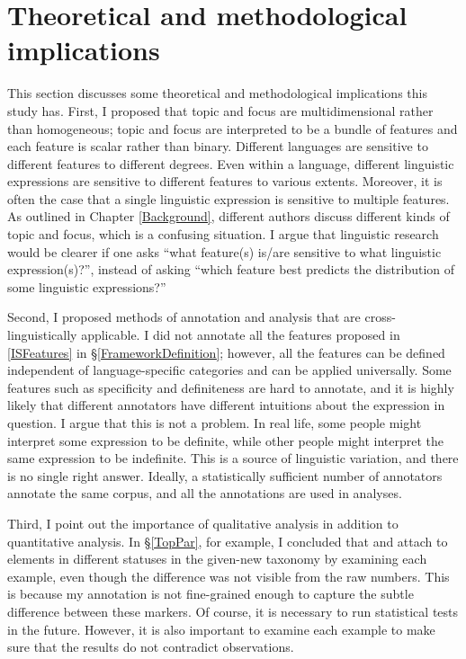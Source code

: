 \section{Theoretical and methodological implications}

This section discusses some theoretical and methodological implications
this study has.
First, I proposed that topic and focus are multidimensional
rather than homogeneous;
topic and focus are interpreted to be a bundle of features and
each feature is scalar rather than binary.
Different languages are sensitive to different features to different degrees.
Even within a language,
different linguistic expressions are sensitive to different features to various extents.
Moreover, it is often the case that
a single linguistic expression is sensitive to multiple features.
As outlined in Chapter \ref{Background},
different authors discuss different kinds of topic and focus,
which is a confusing situation.
I argue that linguistic research would be clearer if one asks
``what feature(s) is/are sensitive to what linguistic expression(s)?'',
instead of asking
``which feature best predicts the distribution of some linguistic expressions?''

Second,
I proposed methods of annotation and analysis
that are cross-linguistically applicable.
I did not annotate all the features proposed in \ref{ISFeatures} in \S \ref{FrameworkDefinition};
however, all the features can be defined independent of language-specific categories and can be applied universally.
Some features such as specificity and definiteness are hard to annotate, and it is highly likely that different annotators have different intuitions about the expression in question.
I argue that this is not a problem.
In real life,
some people might interpret some expression to be definite,
while other people might interpret the same expression to be indefinite.
This is a source of linguistic variation, and there is no single right answer.
Ideally, a statistically sufficient number of annotators annotate the same corpus, and all the annotations are used in analyses.

Third,
I point out the importance of qualitative analysis in addition to quantitative analysis.
In \S \ref{TopPar}, for example,
I concluded that  and  attach to elements in different statuses in the given-new taxonomy by examining each example,
even though the difference was not visible from the raw numbers.
This is because my annotation is not fine-grained enough to capture the subtle difference between these markers.
Of course, it is necessary to run statistical tests in the future.
However, it is also important to examine each example to make sure that
the results do not contradict observations.



